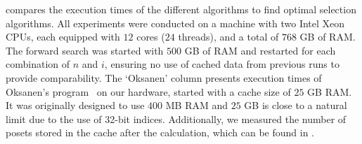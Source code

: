 \documentclass[a4paper,UKenglish,cleveref, autoref, thm-restate]{lipics-v2021}
\begin{document}
 compares the execution times of the different algorithms to find optimal selection algorithms.
All experiments were conducted on a machine with two Intel Xeon CPUs, each equipped with $12$ cores ($24$ threads), and a total of $768$ GB of RAM.
The forward search was started with $500$ GB of RAM and restarted for each combination of $n$ and $i$, ensuring no use of cached data from previous runs to provide comparability.
The `Oksanen' column presents execution times of Oksanen's program~\cite{Oksanen} on our hardware, started with a cache size of $25$ GB RAM.
It was originally designed to use $400$ MB RAM and $25$ GB is close to a natural limit due to the use of 32-bit indices.
Additionally, we measured the number of posets stored in the cache after the calculation, which can be found in .
\end{document}
